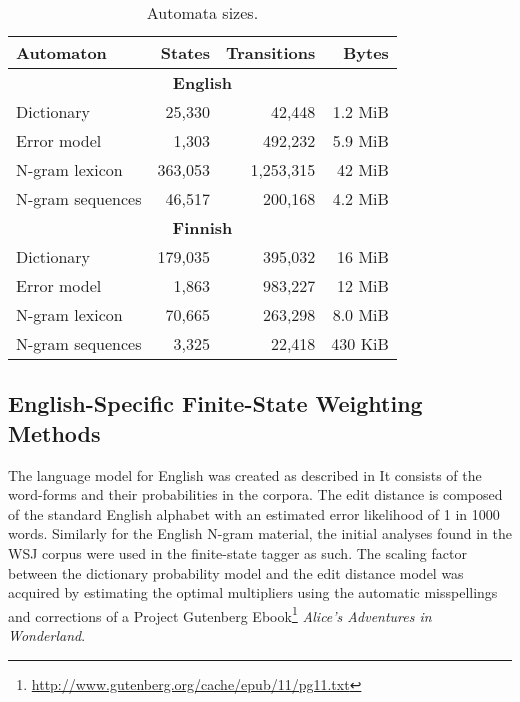 \documentclass{llncs}
\begin{document}
\begin{table}
\caption{Automata sizes\label{table:sizes}.}
\begin{center}
\begin{tabular}{lrrr}
    Automaton & States & Transitions & Bytes \\
    \hline
    \multicolumn{4}{c}{\textbf{English}} \\
    \hline
    Dictionary & 25,330 & 42,448 & 1.2 MiB \\
    Error model & 1,303 & 492,232 & 5.9 MiB \\
    N-gram lexicon & 363,053 & 1,253,315 & 42 MiB \\
    N-gram sequences & 46,517 & 200,168 & 4.2 MiB \\
    \hline
    \multicolumn{4}{c}{\textbf{Finnish}} \\
    \hline
    Dictionary & 179,035 & 395,032 & 16 MiB \\
    Error model & 1,863 & 983,227 & 12 MiB \\
    N-gram lexicon & 70,665 & 263,298 & 8.0 MiB \\
    N-gram sequences & 3,325 & 22,418 & 430 KiB \\
    \hline
\end{tabular}
\end{center}
\end{table}

\subsection{English-Specific Finite-State Weighting Methods}

The language model for English was created as described in
\cite{norvig/2010}
  It consists of the word-forms and their  probabilities in the
corpora. The edit distance is composed of the standard English alphabet with
an estimated error likelihood of 1 in 1000 words.  Similarly for the English N-gram
material, the initial analyses found in the WSJ corpus were used in the
finite-state tagger as such. The scaling factor between the dictionary probability model and
the edit distance model was acquired by estimating the optimal multipliers using the automatic
misspellings and corrections of a Project Gutenberg Ebook\footnote{\url{http://www.gutenberg.org/cache/epub/11/pg11.txt}} \emph{Alice's Adventures in Wonderland}.
\end{document}
